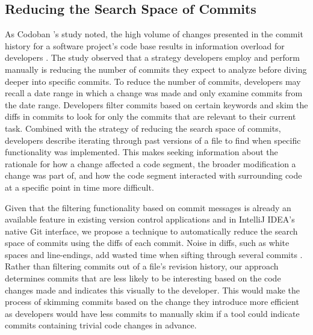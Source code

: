 \subsection{Reducing the Search Space of Commits}
\label{subsec:Reducing-Commit-Search-Space}

As Codoban \etal's study noted, the high volume of changes presented in the commit history for a software project's code base results in information overload for developers \cite{codoban_software_2015}.
The study observed that a strategy developers employ and perform manually is reducing the number of commits they expect to analyze before diving deeper into specific commits.
To reduce the number of commits, developers may recall a date range in which a change was made and only examine commits from the date range.
Developers filter commits based on certain keywords and skim the diffs in commits to look for only the commits that are relevant to their current task.
Combined with the strategy of reducing the search space of commits, developers describe iterating through past versions of a file to find when specific functionality was implemented.
This makes seeking information about the rationale for how a change affected a code segment, the broader modification a change was part of, and how the code segment interacted with surrounding code at a specific point in time more difficult.

Given that the filtering functionality based on commit messages is already an available feature in existing version control  applications and in IntelliJ IDEA's native Git interface, we propose a technique to automatically reduce the search space of commits using the diffs of each commit.
Noise in diffs, such as white spaces and line-endings, add wasted time when sifting through several commits \cite{codoban_software_2015}.
Rather than filtering commits out of a file's revision history, our approach determines commits that are less likely to be interesting based on the code changes made and indicates this visually to the developer.
This would make the process of skimming commits based on the change they introduce more efficient as developers would have less commits to manually skim if a tool could indicate commits containing trivial code changes in advance.

